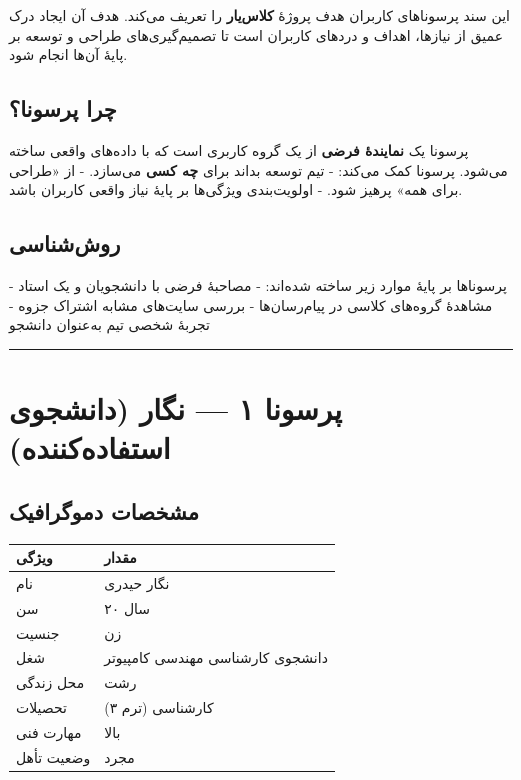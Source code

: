 \documentclass[12pt, a4paper]{article}
\begin{document}
این سند پرسوناهای کاربران هدف پروژهٔ \textbf{کلاس‌یار} را تعریف می‌کند.
هدف آن ایجاد درک عمیق از نیازها، اهداف و دردهای کاربران است تا
تصمیم‌گیری‌های طراحی و توسعه بر پایهٔ آن‌ها انجام شود.

\subsection{چرا پرسونا؟}

پرسونا یک \textbf{نمایندهٔ فرضی} از یک گروه کاربری است که با داده‌های واقعی
ساخته می‌شود. پرسونا کمک می‌کند:
- تیم توسعه بداند برای \textbf{چه کسی} می‌سازد.
- از «طراحی برای همه» پرهیز شود.
- اولویت‌بندی ویژگی‌ها بر پایهٔ نیاز واقعی کاربران باشد.

\subsection{روش‌شناسی}

پرسوناها بر پایهٔ موارد زیر ساخته شده‌اند:
- مصاحبهٔ فرضی با دانشجویان و یک استاد
- مشاهدهٔ گروه‌های کلاسی در پیام‌رسان‌ها
- بررسی سایت‌های مشابه اشتراک جزوه
- تجربهٔ شخصی تیم به‌عنوان دانشجو

\begin{center}\rule{0.5\linewidth}{0.5pt}\end{center}

\section{پرسونا ۱ — نگار (دانشجوی استفاده‌کننده)}

\subsection{مشخصات دموگرافیک}

{\def\LTcaptype{none} %
\begin{longtable}[]{@{}ll@{}}
\toprule\noalign{}
ویژگی & مقدار \\
\midrule\noalign{}
\endhead
\bottomrule\noalign{}
\endlastfoot
نام & نگار حیدری \\
سن & ۲۰ سال \\
جنسیت & زن \\
شغل & دانشجوی کارشناسی مهندسی کامپیوتر \\
محل زندگی & رشت \\
تحصیلات & کارشناسی (ترم ۳) \\
مهارت فنی & بالا \\
وضعیت تأهل & مجرد \\
\end{longtable}
}
\end{document}
